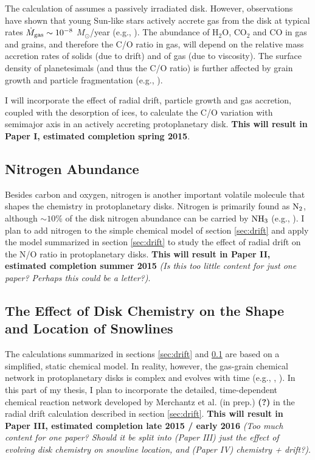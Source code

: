 \documentclass[manuscript]{aastex}
\begin{document}
The calculation of \citet{oberg11} assumes a passively irradiated disk. However, observations have shown that young Sun-like stars actively accrete gas from the disk at typical rates $\dot{M}_{\rm gas} \sim 10^{-8}$ $M_{\odot}$/year (e.g., \citealt{hartmann06}). The abundance of H$_2$O, CO$_2$ and CO in gas and grains, and therefore the C/O ratio in gas, will depend on the relative mass accretion rates of solids (due to drift) and of gas (due to viscosity). The surface density of planetesimals (and thus the C/O ratio) is further affected by grain growth and particle fragmentation (e.g., \citealt{birnstiel12}).

I will incorporate the effect of radial drift, particle growth and gas accretion, coupled with the desorption of ices, to calculate the C/O variation with semimajor axis in an actively accreting protoplanetary disk. \textbf{This will result in Paper I, estimated completion spring 2015}.

\subsection{Nitrogen Abundance}
\label{sec:nitrogen}

Besides carbon and oxygen, nitrogen is another important volatile molecule that shapes the chemistry in protoplanetary disks. Nitrogen is primarily found as $\rm{N}_2$, although $\sim$$10$\% of the disk nitrogen abundance can be carried by $\rm{NH}_3$ (e.g., \citealt{lahuis00}). I plan to add nitrogen to the simple chemical model of section \ref{sec:drift} and apply the model summarized in section \ref{sec:drift} to study the effect of radial drift on the N/O ratio in protoplanetary disks. \textbf{This will result in Paper II, estimated completion summer 2015} \textit{(Is this too little content for just one paper? Perhaps this could be a letter?)}. 

\subsection{The Effect of Disk Chemistry on the Shape and Location of Snowlines}

The calculations summarized in sections \ref{sec:drift} and \ref{sec:nitrogen} are based on a simplified, static chemical model. In reality, however, the gas-grain chemical network in protoplanetary disks is complex and evolves with time (e.g., \citealt{bergin09}, \citealt{fogel11}). In this part of my thesis, I plan to incorporate the detailed, time-dependent chemical reaction network developed by Merchantz et al. (in prep.) \textbf{(?)} in the radial drift calculation described in section \ref{sec:drift}. \textbf{This will result in Paper III, estimated completion late 2015 / early 2016} \textit{(Too much content for one paper? Should it be split into (Paper III) just the effect of evolving disk chemistry on snowline location, and (Paper IV) chemistry + drift?)}.
\end{document}
